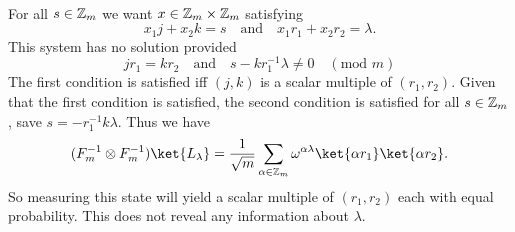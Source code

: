 \documentclass[letterpaper,12pt,oneside,onecolumn]{article}
\begin{document}
\paragraph{}
For all $s \in \mathbb{Z}_m$ we want $x \in \mathbb{Z}_m \times \mathbb{Z}_m$ satisfying
$$x_1j + x_2k = s \quad\text{and}\quad x_1r_1 + x_2r_2 = \lambda.$$
This system has no solution provided
$$jr_1 = kr_2 \quad \text{and} \quad s -kr_1^{-1}\lambda\neq 0 \quad(\text{mod } m)$$
The first condition is satisfied iff $(j,k)$ is a scalar multiple of $(r_1,r_2)$. Given that the first condition is satisfied, the second condition is satisfied for all $s \in \mathbb{Z}_m$, save $s = -r^{-1}_1k\lambda$. Thus we have
$$(F^{-1}_m \otimes F^{-1}_m) \ket{L_\lambda} = \frac{1}{\sqrt{m}} \sum_{\alpha \in \Z_m} \omega^{\alpha \lambda}\ket{\alpha r_1}\ket{\alpha r_2}.$$
So measuring this state will yield a scalar multiple of $(r_1,r_2)$ each with equal probability. This does not reveal any information about $\lambda$.
\end{document}
